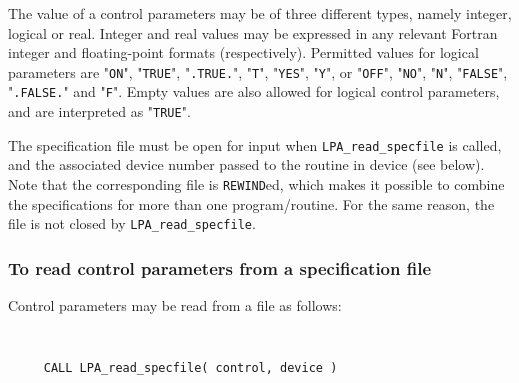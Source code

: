 \documentclass{galahad}
\newcommand{\packagename}{LPA}
\begin{document}
The value of a control parameters may be of three different types, namely
integer, logical or real.
Integer and real values may be expressed in any relevant Fortran integer and
floating-point formats (respectively). Permitted values for logical
parameters are "{\tt ON}", "{\tt TRUE}", "{\tt .TRUE.}", "{\tt T}",
"{\tt YES}", "{\tt Y}", or "{\tt OFF}", "{\tt NO}",
"{\tt N}", "{\tt FALSE}", "{\tt .FALSE.}" and "{\tt F}".
Empty values are also allowed for
logical control parameters, and are interpreted as "{\tt TRUE}".

The specification file must be open for
input when {\tt \packagename\_read\_specfile}
is called, and the associated device number
passed to the routine in device (see below).
Note that the corresponding
file is {\tt REWIND}ed, which makes it possible to combine the specifications
for more than one program/routine.  For the same reason, the file is not
closed by {\tt \packagename\_read\_specfile}.

\subsubsection{To read control parameters from a specification file}
\label{readspec}

Control parameters may be read from a file as follows:
\hskip0.5in

\def\baselinestretch{0.8}
{\tt
\begin{verbatim}
     CALL LPA_read_specfile( control, device )
\end{verbatim}
}
\def\baselinestretch{1.0}
\end{document}
